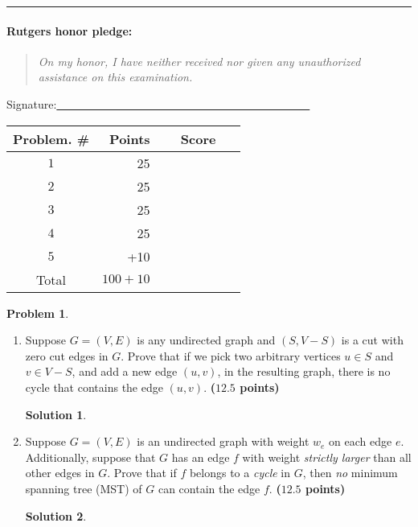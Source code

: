 \documentclass{article}
\theoremstyle{definition}
\newtheorem{problem}{Problem}
\def\fline{\rule{0.75\linewidth}{0.5pt}}
\newcommand{\finishline}{\vspace{-15pt}\begin{center}\fline\end{center}}
\newtheorem*{solution*}{Solution}
\newenvironment{solution}{\begin{solution*}}{{} \end{solution*}}
\newcommand{\grade}[1]{\hfill{\textbf{($\mathbf{#1}$ points)}}}
\begin{document}
\finishline

\paragraph{Rutgers honor pledge:} 

\begin{quote}
\emph{On my honor, I have neither received nor given any unauthorized assistance on this
examination.} 
\end{quote}
\hfill{Signature:\underline{~~~~~~~~~~~~~~~~~~~~~~~~~~~~~~~~~~~~~~~~~~~~~}}

\bigskip

\begin{center}
\begin{tabular}{|c|r|c|}
\hline
Problem. \# & Points & Score \\ \hline\hline
$1$ & 25 & ~~~~~~~~~~~\\  \hline
$2$ & 25 & \\ \hline
$3$ & 25 & \\ \hline
$4$ & 25 & \\ \hline
$5$ & +10 & \\ \hline
Total & $100 + 10$ & \\ \hline
\end{tabular}
\end{center}

\newpage

\begin{problem}\label{basics}~
\begin{enumerate}[label=(\alph*)]
	\item Suppose $G=(V,E)$ is any undirected graph and $(S,V-S)$ is a cut with zero cut edges in $G$. Prove that if we pick two arbitrary vertices $u \in S$ and $v \in V - S$, and add a new edge $(u,v)$, in the resulting graph, there is no cycle that contains the edge $(u,v)$. 
	\grade{12.5}
	
	\begin{solution}

	\end{solution}
	
	\newpage
	\item Suppose $G = (V,E)$ is an undirected graph with weight $w_e$ on each edge $e$. Additionally, suppose that $G$ has an edge $f$ with weight \emph{strictly larger} than all other edges in $G$. 
	Prove that if $f$ belongs to a \emph{cycle} in $G$, then \emph{no} minimum spanning tree (MST) of $G$ can contain the edge $f$. 
	 \grade{12.5}
	 
	 \begin{solution}

	\end{solution}
	
\end{enumerate}
\end{problem}
\end{document}
